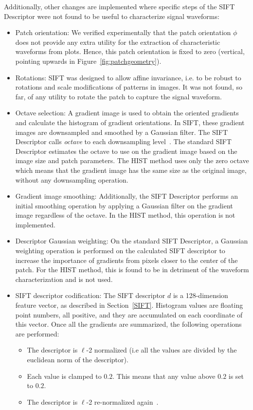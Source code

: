 \documentclass[utf8]{frontiersSCNS} %
\begin{document}
Additionally, other changes are implemented where specific steps of the SIFT Descriptor were not found to be useful to characterize signal waveforms:

\begin{itemize}
\item Patch orientation: We verified experimentally that the patch orientation $\phi$ does not provide any extra utility for the extraction of characteristic waveforms from plots.  Hence, this patch orientation is fixed to zero (vertical, pointing upwards in Figure~\ref{fig:patchgeometry}).
\item Rotations: SIFT was designed to allow affine invariance, i.e. to be robust to rotations and scale modifications of patterns in images.  It was not found, so far, of any utility to rotate the patch to capture the signal waveform.  
\item Octave selection: A gradient image is used to obtain the oriented gradients and calculate the histogram of gradient orientations.  In SIFT, these gradient images are downsampled and smoothed by a Gaussian filter.  The SIFT Descriptor calls \textit{octave} to each downsampling level~\citep{Lowe2004,Rey-Otero2014}.  The standard SIFT Descriptor estimates the octave to use on the gradient image based on the image size and patch parameters.   The HIST method  uses only the zero octave which means that the gradient image has the same size as the original image, without any downsampling operation.
\item Gradient image smoothing: Additionally, the SIFT Descriptor performs an initial smoothing operation by applying a Gaussian filter on the gradient image regardless of the octave.  In the HIST method, this operation is not implemented.
\item Descriptor Gaussian weighting: On the standard SIFT Descriptor, a Gaussian weighting operation is performed on the calculated SIFT descriptor to increase the importance of gradients from pixels closer to the center of the patch.  For the HIST method, this is found to be in detriment of the waveform characterization and is not used.
\item SIFT descriptor codification: The SIFT descriptor $d$ is a 128-dimension feature vector, as described in Section~\ref{SIFT}.  Histogram values are floating point numbers, all positive, and they are accumulated on each coordinate of this vector.  Once all the gradients are summarized, the following operations are performed:

\begin{itemize}
\item The descriptor is $\ell$-2 normalized (i.e all the values are divided by the euclidean norm of the descriptor).
\item Each value is clamped to $0.2$.  This means that any value above $0.2$ is set to $0.2$.
\item The descriptor is $\ell$-2 re-normalized again~\citep{Rey-Otero2014}.
\end{itemize}


\end{itemize}
\end{document}
